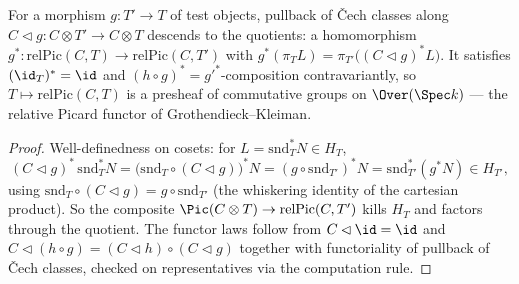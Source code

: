 \begin{definition}
  \label{pa-def:relPicMap}
  \leanok

  For a morphism \(g \colon T' \to T\) of test objects, pullback of \v Cech classes along
  \(C \lhd g \colon C \otimes T' \to C \otimes T\) descends to the quotients: a homomorphism
  \(g^{*} \colon \mathrm{relPic}(C,T) \to \mathrm{relPic}(C,T')\) with
  \(g^{*}(\pi_T L) = \pi_{T'}\bigl((C \lhd g)^{*} L\bigr)\). It satisfies
  \((\id_T)^{*} = \id\) and \((h \circ g)^{*} = g'^{*}\)-composition contravariantly, so
  \(T \mapsto \mathrm{relPic}(C,T)\) is a presheaf of commutative groups on
  \(\Over(\Spec k)\) — the relative Picard functor of Grothendieck--Kleiman.
\end{definition}
\begin{proof}
  \leanok
  Well-definedness on cosets: for \(L = \mathrm{snd}_T^{*} N \in H_T\),
  \[
    (C \lhd g)^{*}\,\mathrm{snd}_T^{*} N
      = \bigl(\mathrm{snd}_T \circ (C \lhd g)\bigr)^{*} N
      = (g \circ \mathrm{snd}_{T'})^{*} N
      = \mathrm{snd}_{T'}^{*}(g^{*} N) \in H_{T'},
  \]
  using \(\mathrm{snd}_T \circ (C \lhd g) = g \circ \mathrm{snd}_{T'}\) (the whiskering
  identity of the cartesian product). So the composite
  \(\Pic(C \otimes T) \to \mathrm{relPic}(C,T')\) kills \(H_T\) and factors through the
  quotient. The functor laws follow from
  \(C \lhd \id = \id\) and \(C \lhd (h \circ g) = (C \lhd h) \circ (C \lhd g)\) together
  with functoriality of pullback of \v Cech classes, checked on representatives via the
  computation rule.
\end{proof}

